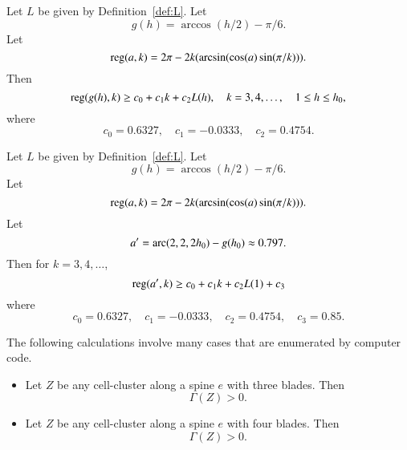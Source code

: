 \begin{calculation}\label{calc:cc:alin}\guid{}
Let $L$ be given by Definition~\ref{def:L}.
Let
\begin{displaymath}
g(h) = \arccos(h/2) - \pi/6.
\end{displaymath}
Let
\begin{displaymath}
{\operatorname{reg}}(a,k) = 2\pi - 2 k (\arcsin(\cos(a)\sin(\pi/k))).
\end{displaymath}
Then
\begin{displaymath}
{\operatorname{reg}}(g(h),k) \ge c_0 + c_1 k + c_2 L(h),\quad
k = 3,4,\ldots,\quad 1\le h\le {h_0},
\end{displaymath}
where
\begin{displaymath}c_0 = 0.6327,\quad c_1 = -0.0333,\quad c_2 = 0.4754.\end{displaymath}
\end{calculation}

\begin{calculation}\label{calc:cc:alin2}\guid{}
Let $L$ be given by Definition~\ref{def:L}.
Let
\begin{displaymath}
g(h) = \arccos(h/2) - \pi/6.
\end{displaymath}
Let
\begin{displaymath}
{\operatorname{reg}}(a,k) = 2\pi - 2 k (\arcsin(\cos(a)\sin(\pi/k))).
\end{displaymath}
Let
\begin{displaymath}a'=\operatorname{arc}(2,2,2{h_0})-g({h_0}) \approx 0.797.\end{displaymath}
Then for $k=3,4,\ldots$, 
\begin{displaymath}{\operatorname{reg}}(a',k) \ge c_0 + c_1 k + c_2 L(1) + c_3\end{displaymath}
where 
\begin{displaymath}c_0 = 0.6327,\quad c_1 = -0.0333,\quad c_2 = 0.4754,\quad c_3 = 0.85.\end{displaymath}
\end{calculation}

\begin{calculation}\label{calc:shorts}
The following calculations involve many cases that are enumerated by computer code.
\begin{itemize}
\item {}  Let $Z$ be any cell-cluster along a spine $e$ with three blades.  Then
\begin{displaymath}
\Gamma(Z)> 0.
\end{displaymath}
\item {}  Let $Z$ be any cell-cluster along a spine $e$ with four blades.  Then
\begin{displaymath}
\Gamma(Z)> 0.
\end{displaymath}
\end{itemize}
\end{calculation}